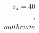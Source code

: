 \documentclass[preview]{standalone}
\begin{document}
\begin{align*}
\special{dvisvgm:raw <g id='unique000'>}s_x = 40\\,\\mathrm{m}\special{dvisvgm:raw </g>}
\end{align*}
\end{document}
